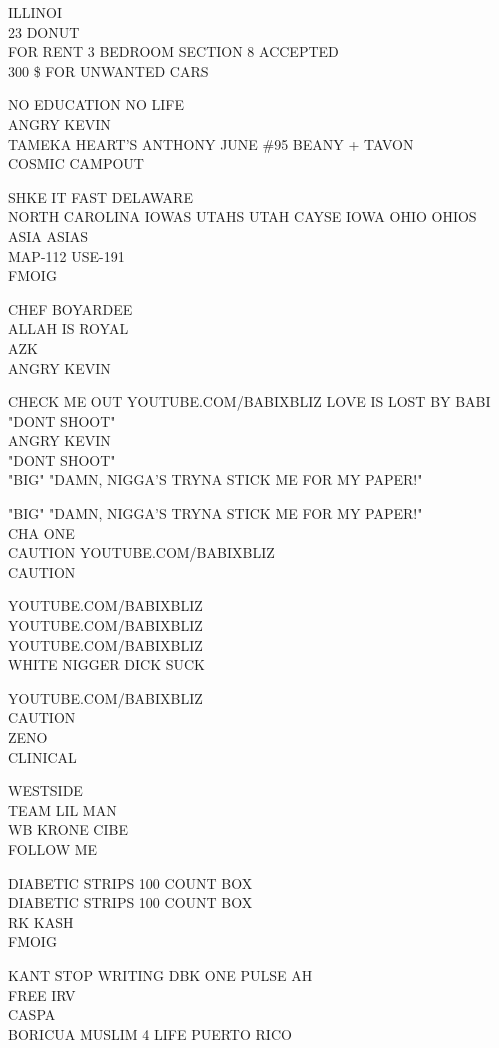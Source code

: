 \documentclass[10pt,letterpaper]{article}
\begin{document}
ILLINOI\\
23 DONUT\\
FOR RENT 3 BEDROOM SECTION 8 ACCEPTED\\
300 \$ FOR UNWANTED CARS

NO EDUCATION NO LIFE\\
ANGRY KEVIN\\
TAMEKA HEART'S ANTHONY JUNE \#95 BEANY + TAVON\\
COSMIC CAMPOUT

SHKE IT FAST DELAWARE\\
NORTH CAROLINA IOWAS UTAHS UTAH CAYSE IOWA OHIO OHIOS ASIA ASIAS\\
MAP{-}112 USE{-}191\\
FMOIG

CHEF BOYARDEE\\
ALLAH IS ROYAL\\
AZK\\
ANGRY KEVIN

CHECK ME OUT YOUTUBE.COM/BABIXBLIZ LOVE IS LOST BY BABI "DONT SHOOT"\\
ANGRY KEVIN\\
"DONT SHOOT"\\
"BIG" "DAMN, NIGGA'S TRYNA STICK ME FOR MY PAPER!"

"BIG" "DAMN, NIGGA'S TRYNA STICK ME FOR MY PAPER!"\\
CHA ONE\\
CAUTION YOUTUBE.COM/BABIXBLIZ\\
CAUTION

YOUTUBE.COM/BABIXBLIZ\\
YOUTUBE.COM/BABIXBLIZ\\
YOUTUBE.COM/BABIXBLIZ\\
WHITE NIGGER DICK SUCK

YOUTUBE.COM/BABIXBLIZ\\
CAUTION\\
ZENO\\
CLINICAL

WESTSIDE\\
TEAM LIL MAN\\
WB KRONE CIBE\\
FOLLOW ME

DIABETIC STRIPS 100 COUNT BOX\\
DIABETIC STRIPS 100 COUNT BOX\\
RK KASH\\
FMOIG

KANT STOP WRITING DBK ONE PULSE AH\\
FREE IRV\\
CASPA\\
BORICUA MUSLIM 4 LIFE PUERTO RICO
\end{document}
